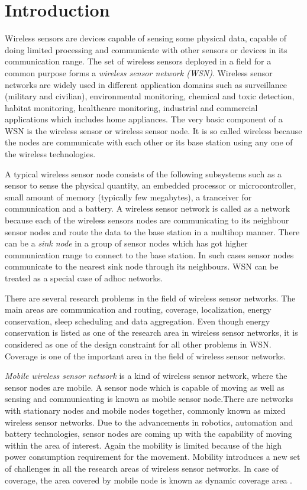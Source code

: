 \chapter{Introduction}
Wireless sensors are devices capable of sensing some physical data, capable of doing limited processing and communicate with other sensors or devices in its communication range. The set of wireless sensors deployed in a field for a common purpose forms a \textit{wireless sensor network (WSN)}. Wireless sensor networks are widely used in different application domains such as surveillance (military and civilian), environmental monitoring, chemical and toxic detection, habitat monitoring, healthcare monitoring,  industrial and commercial applications which includes home appliances. The very basic component of a WSN is the wireless sensor or wireless sensor node. It is so called wireless because the nodes are communicate with each other or its base station using any one of the wireless technologies. 

A typical wireless sensor node consists of the following subsystems such as a sensor to sense the physical quantity, an embedded processor or microcontroller, small amount of memory (typically few megabytes), a tranceiver for communication and a battery. A wireless sensor network is called as a network because each of the wireless sensors nodes are communicating to its neighbour sensor nodes and route the data to the base station in a multihop manner. There can be a \textit{sink node} in a group of sensor nodes which has got higher communication range to connect to the base station. In such cases sensor nodes communicate to the nearest sink node through its neighbours. WSN can be treated as a special case of adhoc networks.

There are several research problems in the field of wireless sensor networks. The main areas are communication and routing, coverage, localization, energy conservation, sleep scheduling and data aggregation. Even though energy conservation is listed as one of the research area in wireless sensor networks, it is considered as one of the design constraint for all other problems in WSN. Coverage is one of the important area in the field of wireless sensor networks. 

\textit{Mobile wireless sensor network} is a kind of wireless sensor network, where the sensor nodes are mobile. A sensor node which is capable of moving as well as sensing and communicating is known as mobile sensor node.There are networks with stationary nodes and mobile nodes together, commonly known as mixed wireless sensor networks\cite{lambrou2012testbed}.  
Due to the advancements in robotics, automation and battery technologies, sensor nodes are coming up with the capability of moving within the area of interest. Again the mobility is limited because of the high power consumption requirement for the movement. 
Mobility introduces a new set of challenges in all the research areas of wireless sensor networks. In case of coverage, the area covered by mobile node is known as dynamic coverage area  \cite{mahboubi2013distributed}. 

